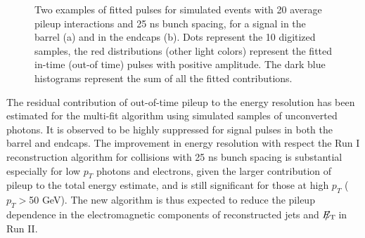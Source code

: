 \documentclass[journal]{IEEEtran}
\newcommand{\ETslash}{\ensuremath{E_{\mathrm{T}}\hspace{-1.1em}/\kern0.45em}}
\begin{document}
\begin{figure}[!t]
\begin{center}
    \caption{Two examples of fitted pulses for simulated events with 20 average pileup interactions and 25 ns bunch spacing, for a signal in the barrel (a) and in the endcaps (b). Dots represent the 10 digitized samples, the red distributions (other light colors) represent the fitted in-time (out-of time) pulses with positive amplitude. The dark blue histograms represent the sum of all the fitted contributions.  \label{fig:multifits} }
  \end{center}
\end{figure}

The residual contribution of out-of-time pileup to the energy resolution has been estimated for the multi-fit algorithm using simulated samples of unconverted photons. It is observed to be highly suppressed for signal pulses in both the barrel and endcaps. The improvement in energy resolution  with respect the Run I reconstruction algorithm for collisions with 25 ns bunch spacing is substantial especially for low $p_T$ photons and electrons, given the larger contribution of pileup to the total energy estimate, and is still significant for those at high $p_T$ ($p_T>$50 GeV). The new algorithm is thus expected to reduce the pileup dependence in the electromagnetic components of reconstructed jets and $\ETslash$ in Run II.
\end{document}

